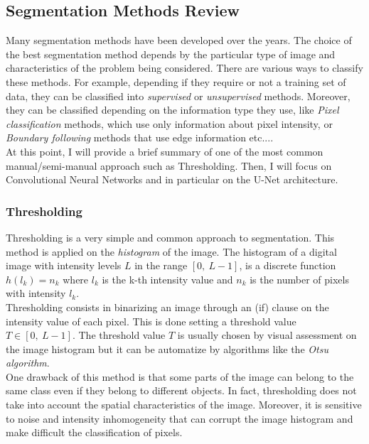 \documentclass{standalone}
\begin{document}
\subsection{Segmentation Methods Review}
Many segmentation methods have been developed over the years. 
The choice of the best segmentation method depends by the particular type of image and characteristics of the problem being considered\cite{imagesegmentation}.
There are various ways to classify these methods.
For example, depending if they require or not a training set of data, they can be classified into \textit{supervised} or \textit{unsupervised} methods.
Moreover, they can be classified depending on the information type they use, like \textit{Pixel classification} methods, which use only information about pixel intensity, or \textit{Boundary following} methods that use edge information etc...\cite{biondi}.
\\
At this point, I will provide a brief summary of one of the most common manual/semi-manual approach such as Thresholding. Then, I will focus on Convolutional Neural Networks and in particular on the U-Net architecture.


\subsubsection{Thresholding}
Thresholding is a very simple and common approach to segmentation.
This method is applied on the \textit{histogram} of the image.
The histogram of a digital image with intensity levels $L$ in the range $[0, \: L-1]$, is a discrete function $h(l_k) = n_k$ where $l_k$ is the k-th intensity value and $n_k$  is the number of pixels with intensity $l_k$.\\
Thresholding consists in binarizing an image through an (if) clause on the intensity value of each pixel.
This is done setting a threshold value $T \in [0, \: L-1]$.
The threshold value $T$ is usually chosen by visual assessment on the image histogram but it can be automatize by algorithms like the \textit{Otsu algorithm}.\\
One drawback of this method is that some parts of the image can belong to the same class even if they belong to different objects.
In fact, thresholding does not take into account the spatial characteristics of the image.
Moreover, it is sensitive to noise and intensity inhomogeneity that can corrupt the image histogram and make difficult the classification of pixels\cite{biondi}.
\end{document}
